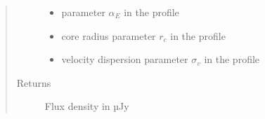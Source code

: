 \documentclass[letterpaper,10pt,english]{sphinxmanual}
\begin{document}
\begin{fulllineitems}
\begin{quote}
\begin{description}
\begin{itemize}
\item {} 
\sphinxAtStartPar
{} \textendash{} parameter \(\alpha_E\) in the {\hyperref[\detokenize{diffsph.profiles:diffsph.profiles.templates.enst}]{}} profile

\item {} 
\sphinxAtStartPar
{} \textendash{} core radius parameter \(r_c\) in the {\hyperref[\detokenize{diffsph.profiles:diffsph.profiles.templates.cnfw}]{}} profile

\item {} 
\sphinxAtStartPar
{} \textendash{} velocity dispersion parameter \(\sigma_v\) in the {\hyperref[\detokenize{diffsph.profiles:diffsph.profiles.templates.sis}]{}} profile

\end{itemize}

\item[{Returns}] \leavevmode
\sphinxAtStartPar
Flux density in µJy

\end{description}\end{quote}

\end{fulllineitems}

\end{document}
